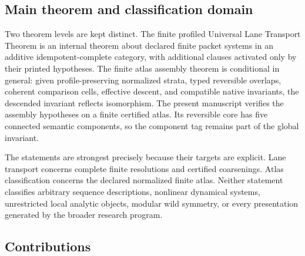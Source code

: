 \documentclass[11pt]{article}
\theoremstyle{definition}
\theoremstyle{remark}
\begin{document}
\subsection{Main theorem and classification domain}

Two theorem levels are kept distinct. The finite profiled Universal Lane Transport Theorem is an internal theorem about declared finite packet systems in an additive idempotent-complete category, with additional clauses activated only by their printed hypotheses. The finite atlas assembly theorem is conditional in general: given profile-preserving normalized strata, typed reversible overlaps, coherent comparison cells, effective descent, and compatible native invariants, the descended invariant reflects isomorphism. The present manuscript verifies the assembly hypotheses on a finite certified atlas. Its reversible core has five connected semantic components, so the component tag remains part of the global invariant.

The statements are strongest precisely because their targets are explicit. Lane transport concerns complete finite resolutions and certified coarsenings. Atlas classification concerns the declared normalized finite atlas. Neither statement classifies arbitrary sequence descriptions, nonlinear dynamical systems, unrestricted local analytic objects, modular wild symmetry, or every presentation generated by the broader research program.

\subsection{Contributions}
\end{document}
